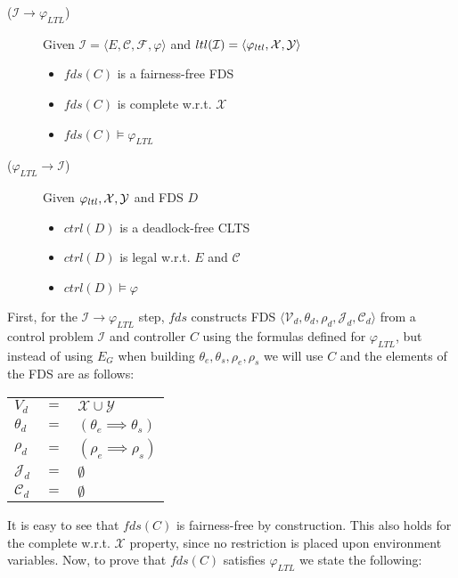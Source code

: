 \begin{description}
	\item[($\mathcal{I} \rightarrow \varphi_{LTL}$)] Given $\mathcal{I} = \langle E, \mathcal{C}, \mathcal{F}, \varphi \rangle$ and $ltl(\mathcal{I}) = \langle \varphi_{ltl}, {\mathcal{X}}, {\mathcal{Y}}\rangle$
		\begin{itemize}
			\item $fds(C)$ is a fairness-free FDS			
			\item $fds(C)$ is complete w.r.t. $\mathcal{X}$
			\item $fds(C) \models \varphi_{LTL}$
		\end{itemize}
	\item[($\varphi_{LTL} \rightarrow \mathcal{I}$)] Given $\varphi_{ltl}, {\mathcal{X}}, {\mathcal{Y}}$ and FDS $D$
		\begin{itemize}
			\item $ctrl(D)$ is a deadlock-free CLTS			
			\item $ctrl(D)$ is legal w.r.t. $E$ and $\mathcal{C}$
			\item $ctrl(D) \models \varphi$
		\end{itemize}	
\end{description}

First,  for the $\mathcal{I} \rightarrow \varphi_{LTL}$ step, $fds$ constructs FDS $\langle \mathcal V_d, \theta_d, \rho_d, \mathcal{J}_d, \mathcal{C}_d \rangle$ from a control problem $\mathcal{I}$ and controller $C$ using the formulas defined for $\varphi_{LTL}$, but instead of using $E_G$ when building $\theta_e,\theta_s,\rho_e,\rho_s$ we will use $C$ and the elements of the FDS are as follows:

	\begin{tabular}{ l c l }
	$V_d$ & $=$ & $\mathcal{X} \cup \mathcal{Y}$\\	
	$\theta_d$ & $=$ & $(\theta_e \implies \theta_s)$\\
	$\rho_d$ & $=$ & $(\rho_e \implies \rho_s)$\\	
	$\mathcal{J}_d$ & $=$ & $\emptyset$\\
	$\mathcal{C}_d$ & $=$ & $\emptyset$\\
\end{tabular}

It is easy to see that $fds(C)$ is fairness-free by construction. This also holds for the complete w.r.t. $\mathcal{X}$ property, since no restriction is placed upon environment variables. Now, to prove that $fds(C)$ satisfies $\varphi_{LTL}$ we state the following:

